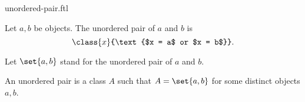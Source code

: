 \documentclass{stex}
\begin{document}
\begin{smodule}{unordered-pair.ftl}

  \begin{forthel}
    \begin{definition}
      Let $a, b$ be objects.
      The unordered pair of $a$ and $b$ is
      \[\class{x}{\text{$x = a$ or $x = b$}}.\]
    \end{definition}

    Let $\set{a,b}$ stand for the unordered pair of $a$ and $b$.
  \end{forthel}

  \begin{forthel}
    \begin{definition}
      An unordered pair is a class $A$ such that $A = \set{a,b}$ for some distinct objects $a, b$.
    \end{definition}
  \end{forthel}
\end{smodule}
\end{document}
